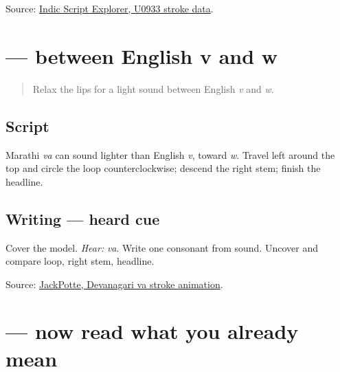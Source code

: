 \begin{tcolorbox}[breakable,colback=teal!4,colframe=teal!35!black,title={Before you move on}]
Source: \href{https://indic-script-explorer.onrender.com/}{Indic Script Explorer, U0933 stroke data}.
\end{tcolorbox}
\section[\texorpdfstring{\mr{व} (va)}{व (va)}]{ — between English v and w}

\label{lesson:MR-W03-va}



\begin{quote}
Relax the lips for a light sound between English \emph{v} and \emph{w}.
\end{quote}

\subsection*{Script}

\begin{quote}
\end{quote}

Marathi \emph{va} can sound lighter than English \emph{v}, toward \emph{w}. Travel left around the top and circle the loop counterclockwise; descend the right stem; finish the headline.

\subsection*{Writing — heard cue}
Cover the model. \emph{Hear:} \emph{va}. Write one consonant from sound. Uncover \textbf{} and compare loop, right stem, headline.

\begin{tcolorbox}[breakable,colback=teal!4,colframe=teal!35!black,title={Before you move on}]
Source: \href{https://commons.wikimedia.org/wiki/File:Devanagari\_v\_\%E0\%A4\%B5.gif}{JackPotte, Devanagari va stroke animation}.
\end{tcolorbox}
\section[\texorpdfstring{\mr{धन्यवाद} (dhanyavād)}{धन्यवाद (dhanyavād)}]{ — now read what you already mean}

